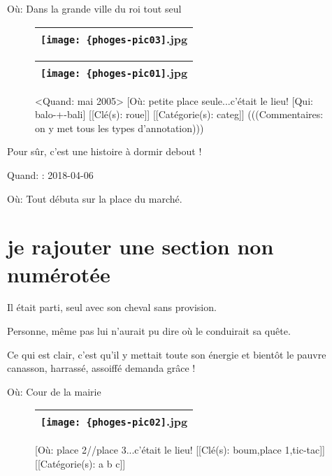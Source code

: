 \documentclass[12pt,twocolumn,french]{article}
\begin{document}
Où: Dans la grande ville du roi tout seul

  \begin{figure}[H]
    \caption{
    }
    \vspace{4mm}
    \label{phoges-pic03.jpg}
    \noindent \centering{}
    \begin{tabular}{|c|}
      \hline
          \texttt{[image: \{phoges-pic03]}.jpg}
        \tabularnewline \hline
    \end{tabular}
  \end{figure}
  \begin{figure}[H]
    \caption{
      <Quand: mai 2005> 
       [Où: petite place seule...c'était le lieu!
       [Qui: balo-+-bali] 
      [[Clé(s): roue]] 
      [[Catégorie(s): categ]] 
      (((Commentaires: on y met tous les types d'annotation)))
    }
    \vspace{4mm}
    \label{phoges-pic01.jpg}
    \noindent \centering{}
    \begin{tabular}{|c|}
      \hline
          \texttt{[image: \{phoges-pic01]}.jpg}
        \tabularnewline \hline
    \end{tabular}
  \end{figure}

Pour sûr, c'est une histoire à dormir debout !


Quand: : 2018-04-06


Où: Tout débuta sur la place du marché.

 \section*{je rajouter une section non numérotée}

Il était parti, seul avec son cheval sans provision.

Personne, même pas lui n'aurait pu dire où le conduirait sa quête.

Ce qui est clair, c'est qu'il y mettait toute son énergie et bientôt le pauvre canasson, harrassé, assoiffé demanda grâce !


Où: Cour de la mairie

  \begin{figure}[H]
    \caption{
       [Où: place 2//place 3...c'était le lieu!
      [[Clé(s): boum,place 1,tic-tac]] 
      [[Catégorie(s): a b c]] 
    }
    \vspace{4mm}
    \label{phoges-pic02.jpg}
    \noindent \centering{}
    \begin{tabular}{|c|}
      \hline
          \texttt{[image: \{phoges-pic02]}.jpg}
        \tabularnewline \hline
    \end{tabular}
  \end{figure}
%
\end{document}

